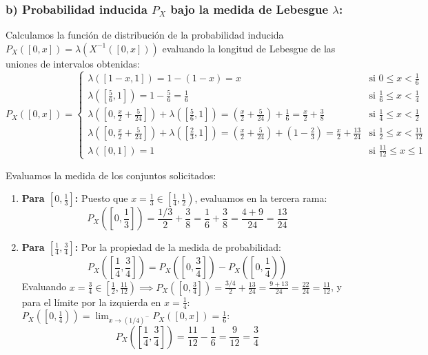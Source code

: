 \begin{problema}
\subsubsection*{b) Probabilidad inducida $P_X$ bajo la medida de Lebesgue $\lambda$:}
Calculamos la función de distribución de la probabilidad inducida $P_X([0, x]) = \lambda(X^{-1}([0, x]))$ evaluando la longitud de Lebesgue de las uniones de intervalos obtenidas:
\[
    P_X([0, x]) = \begin{cases}
        \lambda([1 - x, 1]) = 1 - (1 - x) = x & \text{si } 0 \le x < \frac{1}{6} \\[6pt]
        \lambda\left(\left[\frac{5}{6}, 1\right]\right) = 1 - \frac{5}{6} = \frac{1}{6} & \text{si } \frac{1}{6} \le x < \frac{1}{4} \\[6pt]
        \lambda\left(\left[0, \frac{x}{2} + \frac{5}{24}\right]\right) + \lambda\left(\left[\frac{5}{6}, 1\right]\right) = \left(\frac{x}{2} + \frac{5}{24}\right) + \frac{1}{6} = \frac{x}{2} + \frac{3}{8} & \text{si } \frac{1}{4} \le x < \frac{1}{2} \\[6pt]
        \lambda\left(\left[0, \frac{x}{2} + \frac{5}{24}\right]\right) + \lambda\left(\left[\frac{2}{3}, 1\right]\right) = \left(\frac{x}{2} + \frac{5}{24}\right) + \left(1 - \frac{2}{3}\right) = \frac{x}{2} + \frac{13}{24} & \text{si } \frac{1}{2} \le x < \frac{11}{12} \\[6pt]
        \lambda([0, 1]) = 1 & \text{si } \frac{11}{12} \le x \le 1
    \end{cases}
\]

Evaluamos la medida de los conjuntos solicitados:
\begin{enumerate}[label=\arabic*.]
    \item \textbf{Para $\left[0, \frac{1}{3}\right]$:}
    Puesto que $x = \frac{1}{3} \in \left[\frac{1}{4}, \frac{1}{2}\right)$, evaluamos en la tercera rama:
    \[
        P_X\left(\left[0, \frac{1}{3}\right]\right) = \frac{1/3}{2} + \frac{3}{8} = \frac{1}{6} + \frac{3}{8} = \frac{4 + 9}{24} = \frac{13}{24}
    \]

    \item \textbf{Para $\left[\frac{1}{4}, \frac{3}{4}\right]$:}
    Por la propiedad de la medida de probabilidad:
    \[
        P_X\left(\left[\frac{1}{4}, \frac{3}{4}\right]\right) = P_X\left(\left[0, \frac{3}{4}\right]\right) - P_X\left(\left[0, \frac{1}{4}\right)\right)
    \]
    Evaluando $x = \frac{3}{4} \in \left[\frac{1}{2}, \frac{11}{12}\right) \implies P_X\left(\left[0, \frac{3}{4}\right]\right) = \frac{3/4}{2} + \frac{13}{24} = \frac{9 + 13}{24} = \frac{22}{24} = \frac{11}{12}$, y para el límite por la izquierda en $x = \frac{1}{4}$: $P_X\left(\left[0, \frac{1}{4}\right)\right) = \lim_{x \to (1/4)^-} P_X([0, x]) = \frac{1}{6}$:
    \[
        P_X\left(\left[\frac{1}{4}, \frac{3}{4}\right]\right) = \frac{11}{12} - \frac{1}{6} = \frac{9}{12} = \frac{3}{4}
    \]


\end{enumerate}
\end{problema}
